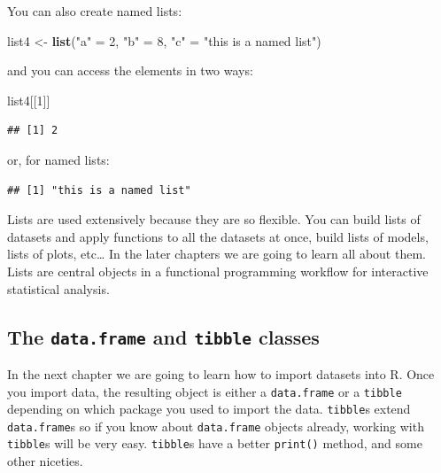 \documentclass[]{gitbook}
\newenvironment{Shaded}{\begin{snugshade}}{\end{snugshade}}
\newcommand{\DecValTok}[1]{\textcolor[rgb]{0.00,0.00,0.81}{#1}}
\newcommand{\KeywordTok}[1]{\textcolor[rgb]{0.13,0.29,0.53}{\textbf{#1}}}
\newcommand{\NormalTok}[1]{#1}
\newcommand{\OperatorTok}[1]{\textcolor[rgb]{0.81,0.36,0.00}{\textbf{#1}}}
\newcommand{\StringTok}[1]{\textcolor[rgb]{0.31,0.60,0.02}{#1}}
\begin{document}
You can also create named lists:

\begin{Shaded}
\begin{Highlighting}[]
\NormalTok{list4 <-}\StringTok{ }\KeywordTok{list}\NormalTok{(}\StringTok{"a"}\NormalTok{ =}\StringTok{ }\DecValTok{2}\NormalTok{, }\StringTok{"b"}\NormalTok{ =}\StringTok{ }\DecValTok{8}\NormalTok{, }\StringTok{"c"}\NormalTok{ =}\StringTok{ "this is a named list"}\NormalTok{)}
\end{Highlighting}
\end{Shaded}

and you can access the elements in two ways:

\begin{Shaded}
\begin{Highlighting}[]
\NormalTok{list4[[}\DecValTok{1}\NormalTok{]]}
\end{Highlighting}
\end{Shaded}

\begin{verbatim}
## [1] 2
\end{verbatim}

or, for named lists:

\begin{Shaded}
\end{Shaded}

\begin{verbatim}
## [1] "this is a named list"
\end{verbatim}

Lists are used extensively because they are so flexible. You can build lists of datasets and apply
functions to all the datasets at once, build lists of models, lists of plots, etc\ldots{} In the later
chapters we are going to learn all about them. Lists are central objects in a functional programming
workflow for interactive statistical analysis.

\hypertarget{the-data.frame-and-tibble-classes}{%
\subsection{\texorpdfstring{The \texttt{data.frame} and \texttt{tibble} classes}{The data.frame and tibble classes}}\label{the-data.frame-and-tibble-classes}}

In the next chapter we are going to learn how to import datasets into R. Once you import data, the
resulting object is either a \texttt{data.frame} or a \texttt{tibble} depending on which package you used to
import the data. \texttt{tibble}s extend \texttt{data.frame}s so if you know about \texttt{data.frame} objects already,
working with \texttt{tibble}s will be very easy. \texttt{tibble}s have a better \texttt{print()} method, and some other
niceties.
\end{document}
